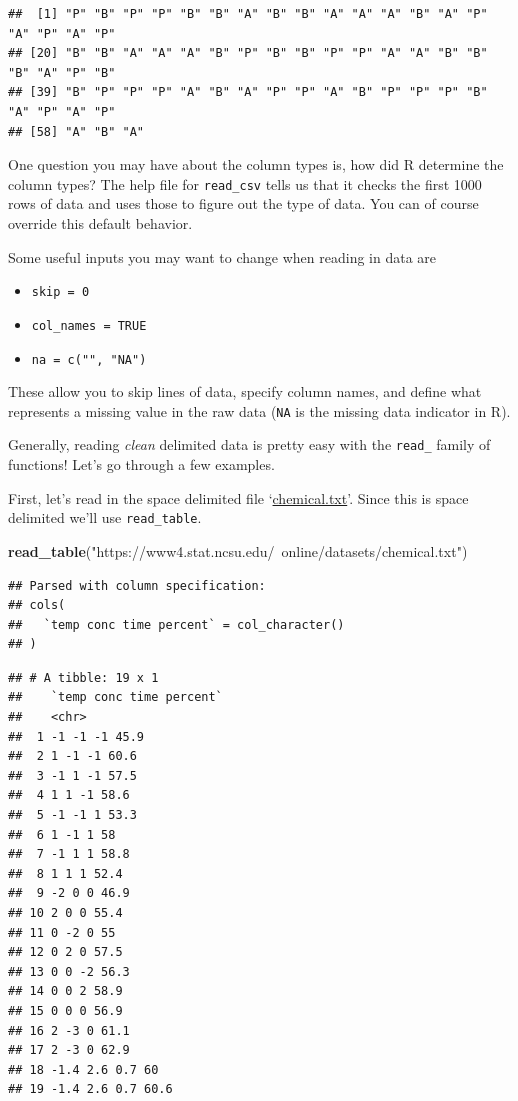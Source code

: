 \documentclass[
]{book}
\newenvironment{Shaded}{\begin{snugshade}}{\end{snugshade}}
\newcommand{\KeywordTok}[1]{\textcolor[rgb]{0.13,0.29,0.53}{\textbf{#1}}}
\newcommand{\NormalTok}[1]{#1}
\newcommand{\StringTok}[1]{\textcolor[rgb]{0.31,0.60,0.02}{#1}}
\theoremstyle{definition}
\theoremstyle{definition}
\theoremstyle{definition}
\theoremstyle{remark}
\begin{document}
\begin{verbatim}
##  [1] "P" "B" "P" "P" "B" "B" "A" "B" "B" "A" "A" "A" "B" "A" "P" "A" "P" "A" "P"
## [20] "B" "B" "A" "A" "A" "B" "P" "B" "B" "P" "P" "A" "A" "B" "B" "B" "A" "P" "B"
## [39] "B" "P" "P" "P" "A" "B" "A" "P" "P" "A" "B" "P" "P" "P" "B" "A" "P" "A" "P"
## [58] "A" "B" "A"
\end{verbatim}

One question you may have about the column types is, how did R determine the column types? The help file for \texttt{read\_csv} tells us that it checks the first 1000 rows of data and uses those to figure out the type of data. You can of course override this default behavior.

Some useful inputs you may want to change when reading in data are

\begin{itemize}
\item
  \texttt{skip\ =\ 0}
\item
  \texttt{col\_names\ =\ TRUE}
\item
  \texttt{na\ =\ c("",\ "NA")}
\end{itemize}

These allow you to skip lines of data, specify column names, and define what represents a missing value in the raw data (\texttt{NA} is the missing data indicator in R).

Generally, reading \emph{clean} delimited data is pretty easy with the \texttt{read\_} family of functions! Let's go through a few examples.

First, let's read in the space delimited file `\href{https://www4.stat.ncsu.edu/~online/datasets/chemical.txt}{chemical.txt}'. Since this is space delimited we'll use \texttt{read\_table}.

\begin{Shaded}
\begin{Highlighting}[]
\KeywordTok{read_table}\NormalTok{(}\StringTok{"https://www4.stat.ncsu.edu/~online/datasets/chemical.txt"}\NormalTok{)}
\end{Highlighting}
\end{Shaded}

\begin{verbatim}
## Parsed with column specification:
## cols(
##   `temp conc time percent` = col_character()
## )
\end{verbatim}

\begin{verbatim}
## # A tibble: 19 x 1
##    `temp conc time percent`
##    <chr>                   
##  1 -1 -1 -1 45.9           
##  2 1 -1 -1 60.6            
##  3 -1 1 -1 57.5            
##  4 1 1 -1 58.6             
##  5 -1 -1 1 53.3            
##  6 1 -1 1 58               
##  7 -1 1 1 58.8             
##  8 1 1 1 52.4              
##  9 -2 0 0 46.9             
## 10 2 0 0 55.4              
## 11 0 -2 0 55               
## 12 0 2 0 57.5              
## 13 0 0 -2 56.3             
## 14 0 0 2 58.9              
## 15 0 0 0 56.9              
## 16 2 -3 0 61.1             
## 17 2 -3 0 62.9             
## 18 -1.4 2.6 0.7 60         
## 19 -1.4 2.6 0.7 60.6
\end{verbatim}
\end{document}
